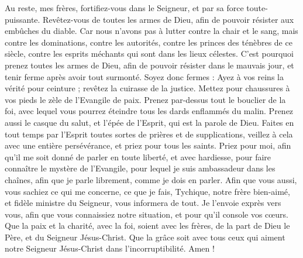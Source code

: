 \begin{multicols}{2}
Au reste, mes frères, fortifiez-vous dans le Seigneur, et par sa force toute-puissante.
Revêtez-vous de toutes les armes de Dieu, afin de pouvoir résister aux embûches du diable.
Car nous n'avons pas à lutter contre la chair et le sang, mais contre les dominations, contre les autorités, contre les princes des ténèbres de ce siècle, contre les esprits méchants qui sont dans les lieux célestes.
C'est pourquoi prenez toutes les armes de Dieu, afin de pouvoir résister dans le mauvais jour, et tenir ferme après avoir tout surmonté.
Soyez donc fermes : Ayez à vos reins la vérité pour ceinture ; revêtez la cuirasse de la justice.
Mettez pour chaussures à vos pieds le zèle de l'Evangile de paix.
Prenez par-dessus tout le bouclier de la foi, avec lequel vous pourrez éteindre tous les dards enflammés du malin.
Prenez aussi le casque du salut, et l'épée de l'Esprit, qui est la parole de Dieu.
Faites en tout temps par l’Esprit toutes sortes de prières et de supplications, veillez à cela avec une entière persévérance, et priez pour tous les saints.
Priez pour moi, afin qu'il me soit donné de parler en toute liberté, et avec hardiesse, pour faire connaître le mystère de l'Evangile,
pour lequel je suis ambassadeur dans les chaînes, afin que je parle librement, comme je dois en parler.
Afin que vous aussi, vous sachiez ce qui me concerne, ce que je fais, Tychique, notre frère bien-aimé, et fidèle ministre du Seigneur, vous informera de tout.
Je l’envoie exprès vers vous, afin que vous connaissiez notre situation, et pour qu'il console vos cœurs.
Que la paix et la charité, avec la foi, soient avec les frères, de la part de Dieu le Père, et du Seigneur Jésus-Christ.
Que la grâce soit avec tous ceux qui aiment notre Seigneur Jésus-Christ dans l'incorruptibilité. Amen !
\PPE{}
\end{multicols}
